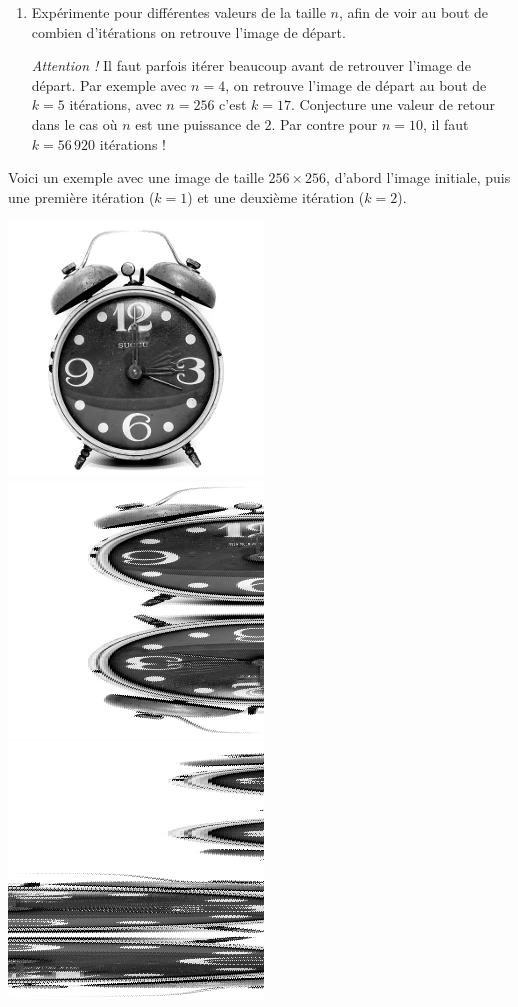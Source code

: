 \documentclass[11pt,class=report,crop=false]{standalone}
\begin{document}
\begin{activite}
\begin{enumerate}
  \item Expérimente pour différentes valeurs de la taille $n$, afin de voir au bout de combien d'itérations on retrouve l'image de départ. 
  
  \emph{Attention !} Il faut parfois itérer beaucoup avant de retrouver l'image de départ. Par exemple avec $n=4$, on retrouve l'image de départ au bout de $k=5$ itérations, avec $n=256$ c'est $k=17$. Conjecture une valeur de retour dans le cas où $n$ est une puissance de $2$. Par contre pour $n=10$, il faut $k = 56\,920$ itérations !
   
  
\end{enumerate}

Voici un exemple avec une image de taille $256 \times 256$, d'abord l'image initiale, puis une première itération ($k=1$) et une deuxième itération ($k=2$).
\begin{center}
\includegraphics[scale=0.4]{images_fiche/reveil_gimp_new_boul_0.png}\qquad
\includegraphics[scale=0.4]{images_fiche/reveil_gimp_new_boul_1.png}\qquad
\includegraphics[scale=0.4]{images_fiche/reveil_gimp_new_boul_2.png}

\end{center}
\end{activite}
\end{document}
